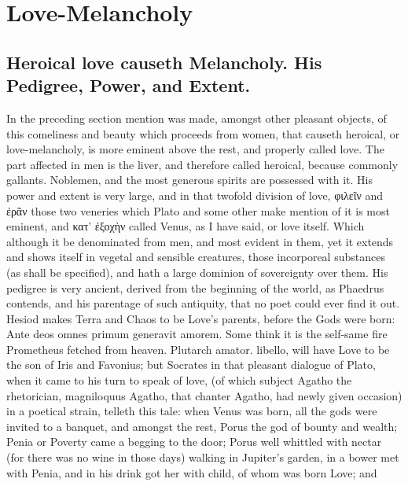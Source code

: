 \chapter{Love-Melancholy}
{

\section[Heroical love]{Heroical love causeth Melancholy. His Pedigree, Power, and Extent.}

In the preceding section mention was made, amongst other pleasant
objects, of this comeliness and beauty which proceeds from women, that
causeth heroical, or love-melancholy, is more eminent above the rest,
and properly called love. The part affected in men is the liver, and
therefore called heroical, because commonly gallants. Noblemen, and the
most generous spirits are possessed with it. His power and extent is
very large,  and in that twofold division of love, φιλεῖν and
ἐρᾶν those two veneries which Plato and some other make mention
of it is most eminent, and κατ' ἐξοχὴν called Venus, as I have said, or
love itself. Which although it be denominated from men, and most
evident in them, yet it extends and shows itself in vegetal and
sensible creatures, those incorporeal substances (as shall be
specified), and hath a large dominion of sovereignty over them. His
pedigree is very ancient, derived from the beginning of the world, as
Phaedrus contends, and his  parentage of such antiquity,
that no poet could ever find it out. Hesiod makes Terra and Chaos
to be Love's parents, before the Gods were born: Ante deos omnes primum
generavit amorem. Some think it is the self-same fire Prometheus
fetched from heaven. Plutarch amator. libello, will have Love to be the
son of Iris and Favonius; but Socrates in that pleasant dialogue of
Plato, when it came to his turn to speak of love, (of which subject
Agatho the rhetorician, magniloquus Agatho, that chanter Agatho, had
newly given occasion) in a poetical strain, telleth this tale: when
Venus was born, all the gods were invited to a banquet, and amongst the
rest, Porus the god of bounty and wealth; Penia or Poverty came a
begging to the door; Porus well whittled with nectar (for there was no
wine in those days) walking in Jupiter's garden, in a bower met with
Penia, and in his drink got her with child, of whom was born Love; and
}
